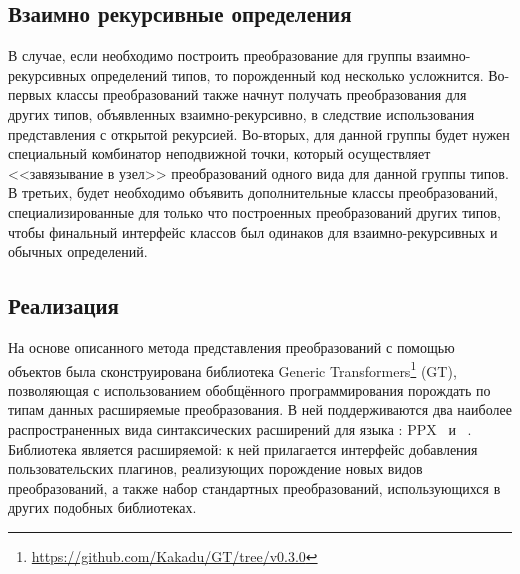 

\subsection{Взаимно рекурсивные определения}
\label{murec}

В случае, если необходимо построить преобразование для группы взаимно-рекурсивных определений типов, то порожденный код несколько усложнится. Во-первых классы преобразований также начнут получать преобразования для других типов, объявленных взаимно-рекурсивно, в следствие использования представления с открытой рекурсией. Во-вторых, для данной группы будет нужен специальный комбинатор неподвижной точки, который осуществляет <<завязывание в узел>> преобразований одного вида для данной группы типов. В третьих, будет необходимо объявить дополнительные классы преобразований, специализированные для только что построенных преобразований других типов, чтобы финальный интерфейс классов был одинаков для взаимно-рекурсивных и обычных определений.


\subsection{Реализация}
На основе описанного метода представления преобразований с помощью объектов была сконструирована библиотека Generic Transformers\footnote{\url{https://github.com/Kakadu/GT/tree/v0.3.0}} (GT), позволяющая с использованием обобщённого программирования порождать по типам данных расширяемые преобразования. В ней поддерживаются два наиболее распространенных вида синтаксических расширений для языка \ocaml{}: \textsc{PPX}~\cite{PPXLib} и \camlpfive~\cite{camlp5}. Библиотека \GT{} является расширяемой: к ней прилагается интерфейс добавления пользовательских плагинов, реализующих порождение новых видов преобразований, а также набор стандартных преобразований, использующихся в других подобных библиотеках.




